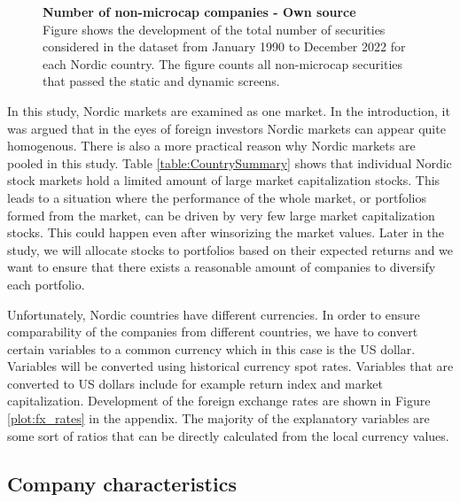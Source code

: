 \documentclass[12pt]{article}
\begin{document}
\begin{figure}[ht]
\centering
\caption[Number of non-micro-cap companies]{\textbf{Number of non-microcap companies \textnormal{- Own source}}\\ Figure shows the development of the total number of securities considered in the dataset from January 1990 to December 2022 for each Nordic country. The figure counts all non-microcap securities that passed the static and dynamic screens.}

\label{plot:number_of_companies_wo_micro}
\end{figure}

In this study, Nordic markets are examined as one market. In the introduction, it was argued that in the eyes of foreign investors Nordic markets can appear quite homogenous. There is also a more practical reason why Nordic markets are pooled in this study. Table \ref{table:CountrySummary} shows that individual Nordic stock markets hold a limited amount of large market capitalization stocks. This leads to a situation where the performance of the whole market, or portfolios formed from the market, can be driven by very few large market capitalization stocks. This could happen even after winsorizing the market values. Later in the study, we will allocate stocks to portfolios based on their expected returns and we want to ensure that there exists a reasonable amount of companies to diversify each portfolio. \par

Unfortunately, Nordic countries have different currencies. In order to ensure comparability of the companies from different countries, we have to convert certain variables to a common currency which in this case is the US dollar. Variables will be converted using historical currency spot rates. Variables that are converted to US dollars include for example return index and market capitalization. Development of the foreign exchange rates are shown in Figure \ref{plot:fx_rates} in the appendix. The majority of the explanatory variables are some sort of ratios that can be directly calculated from the local currency values. \par

\subsection{Company characteristics}\label{CompanyCharacteristics}
\end{document}
